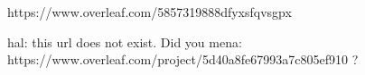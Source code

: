 
https://www.overleaf.com/5857319888dfyxsfqvsgpx

hal: this url does not exist. Did you mena:
https://www.overleaf.com/project/5d40a8fe67993a7c805ef910 ?


